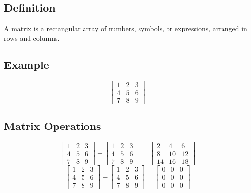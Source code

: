 \documentclass[titlepage,a4paper]{article}
\begin{document}
	\subsection{Definition}
			A matrix is a rectangular array of numbers, symbols, or expressions, arranged in rows and columns.
		\subsection{Example}
			\begin{equation*}
				\left[
				\begin{matrix}
					1 & 2 & 3 \\
					4 & 5 & 6 \\
					7 & 8 & 9
				\end{matrix}
				\right]
			\end{equation*}
		\subsection{Matrix Operations}
			\begin{equation*}
				\left[
				\begin{matrix}
					1 & 2 & 3 \\
					4 & 5 & 6 \\
					7 & 8 & 9
				\end{matrix}
				\right]
				+
				\left[
				\begin{matrix}
					1 & 2 & 3 \\
					4 & 5 & 6 \\
					7 & 8 & 9
				\end{matrix}
				\right]
				=
				\left[
				\begin{matrix}
					2 & 4 & 6 \\
					8 & 10 & 12 \\
					14 & 16 & 18
				\end{matrix}
				\right]
			\end{equation*}
			\begin{equation*}
				\left[
				\begin{matrix}
					1 & 2 & 3 \\
					4 & 5 & 6 \\
					7 & 8 & 9
				\end{matrix}
				\right]
				-
				\left[
				\begin{matrix}
					1 & 2 & 3 \\
					4 & 5 & 6 \\
					7 & 8 & 9
				\end{matrix}
				\right]
				=
				\left[
				\begin{matrix}
					0 & 0 & 0 \\
					0 & 0 & 0 \\
					0 & 0 & 0
				\end{matrix}
				\right]
			\end{equation*}
\end{document}
